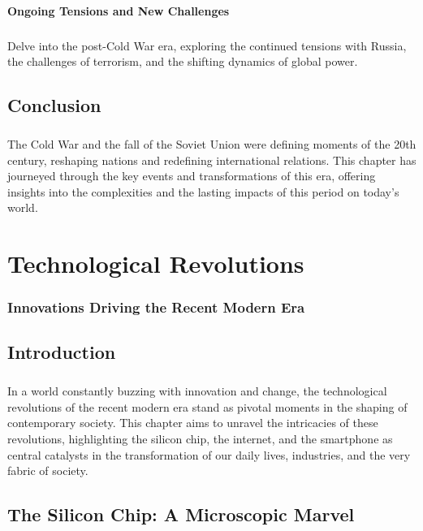 \documentclass[a4paper,12pt]{book}
\begin{document}
\subsubsection*{Ongoing Tensions and New Challenges}
\paragraph{}
Delve into the post-Cold War era, exploring the continued tensions with Russia, the challenges of terrorism, and the shifting dynamics of global power.

\section*{Conclusion}
\paragraph{}
The Cold War and the fall of the Soviet Union were defining moments of the 20th century, reshaping nations and redefining international relations. This chapter has journeyed through the key events and transformations of this era, offering insights into the complexities and the lasting impacts of this period on today’s world.

\chapter{Technological Revolutions}
\subsection*{Innovations Driving the Recent Modern Era}

\section*{Introduction}
\paragraph{}
In a world constantly buzzing with innovation and change, the technological revolutions of the recent modern era stand as pivotal moments in the shaping of contemporary society. This chapter aims to unravel the intricacies of these revolutions, highlighting the silicon chip, the internet, and the smartphone as central catalysts in the transformation of our daily lives, industries, and the very fabric of society.

\section*{The Silicon Chip: A Microscopic Marvel}
\end{document}
